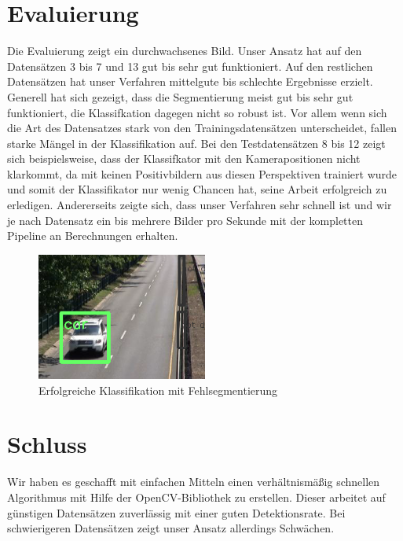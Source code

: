 \documentclass[conference]{IEEEtran}
\begin{document}
\section{Evaluierung}

Die Evaluierung zeigt ein durchwachsenes Bild.
Unser Ansatz hat auf den Datensätzen 3 bis 7 und 13 gut bis sehr gut funktioniert. Auf den restlichen Datensätzen hat unser Verfahren mittelgute bis schlechte Ergebnisse erzielt. Generell hat sich gezeigt, dass die Segmentierung meist gut bis sehr gut funktioniert, die Klassifkation dagegen nicht so robust ist.
Vor allem wenn sich die Art des Datensatzes stark von den Trainingsdatensätzen unterscheidet, fallen starke Mängel in der Klassifikation auf. Bei den Testdatensätzen 8 bis 12 zeigt sich beispielsweise, dass der Klassifkator mit den Kamerapositionen nicht klarkommt, da mit keinen Positivbildern aus diesen Perspektiven trainiert wurde und somit der Klassifikator nur wenig Chancen hat, seine Arbeit erfolgreich zu erledigen.
Andererseits zeigte sich, dass unser Verfahren sehr schnell ist und wir je nach Datensatz ein bis mehrere Bilder pro Sekunde mit der kompletten Pipeline an Berechnungen erhalten.

\begin{figure}
\includegraphics[width=0.5\textwidth]{ds13_car01}
\caption{Erfolgreiche Klassifikation mit Fehlsegmentierung}
\end{figure}

\section{Schluss}

Wir haben es geschafft mit einfachen Mitteln einen verhältnismäßig schnellen Algorithmus mit Hilfe der OpenCV-Bibliothek zu erstellen. Dieser arbeitet auf günstigen Datensätzen zuverlässig mit einer guten Detektionsrate. Bei schwierigeren Datensätzen zeigt unser Ansatz allerdings Schwächen.
\end{document}
